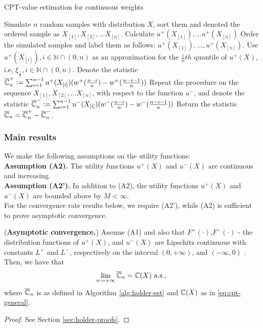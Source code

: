 \documentclass[11pt,letterpaper,english]{article}
\begin{document}

\begin{algorithm}
\caption{CPT-value estimation for \holder continuous weights}
\label{alg:holder-est}
\begin{algorithmic}[1]
\State Simulate $n$ random samples with distribution $X$, sort them and denoted the ordered sample as 
$X_{[1]}, X_{[2]}, \ldots X_{[n]}$.
\State Calculate $u^+(X_{[1]}),\ldots u^+(X_{[n]})$
\State Order the simulated samples and label them as follows: 
$u^+(X_{[1]}),\ldots,u^+(X_{[n]})$.
\State Use $u^+(X_{[i]}), i\in \mathbb{N}\cap (0,n)$ as an approximation for the $\frac{i}{n} th$ quantile of $u^+(X)$, i.e, $\xi_{\frac{i}{n}}, i\in \mathbb{N}\cap (0,n)$.
\State Denote the statistic 
$\overline {\mathbb{C}}_n^+:=\sum_{i=1}^{n-1} u^+(X_{[i]}) (w^+(\frac{n-i}{n})- w^+(\frac{n-i-1}{n}) )$
\State Repeat the procedure on the sequence $X_{[1]}, X_{[2]}, \ldots X_{[n]}$, with respect to the function $u^-$, 
and denote the statistic $\overline {\mathbb{C}}_n^-:=\sum_{i=1}^{n-1} u^-(X_{[i]}) (w^-(\frac{n-i}{n})- w^-(\frac{n-i-1}{n}) ) $
\State Return the statistic $\overline {\mathbb{C}}_n =\overline {\mathbb{C}}_n^+ - \overline {\mathbb{C}}_n^-$.
\end{algorithmic}
\end{algorithm}

\subsubsection*{Main results}
We make the following assumptions on the utility functions:\\[1ex]
\textbf{Assumption (A2).}  The utility functions $u^+(X)$ and $u^-(X)$ are continuous and increasing.\\[1ex]
\textbf{Assumption (A2').}  In addition to (A2), the utility functions $u^+(X)$ and $u^-(X)$ are bounded above by $M<\infty$.\\[1ex]
For the convergence rate results below, we require (A2'), while (A2) is sufficient to prove asymptotic convergence.

\begin{proposition}(\textbf{Asymptotic convergence.})
\label{prop:holder-asymptotic}
Assume (A1) and also that $F^+(\cdot)$,$F^-(\cdot)$ - the distribution functions of $u^+(X)$, and $u^-(X)$ are Lipschitz continuous with constants $L^+$ and $L^-$, respectively on the interval $(0,+\infty)$, and 
$(-\infty, 0)$ . Then, we have that
\begin{align}
\lim_{n\rightarrow +\infty} 
\overline {\mathbb{C}}_n
=
\mathbb{C}(X)
 \text{   a.s.,}
\end{align}
where $\overline {\mathbb{C}}_n$ is as defined in Algorithm \ref{alg:holder-est} and $\mathbb{C}(X)$ as in \eqref{eq:cpt-general}.
\end{proposition}
\begin{proof}
See Section \ref{sec:holder-proofs}.
\end{proof}
\end{document}
